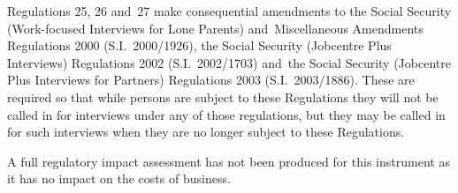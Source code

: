 \documentclass[12pt,a4paper]{article}
\begin{document}
Regulations 25, 26 and~27 make consequential amendments to the Social Security (Work-focused Interviews for Lone Parents) and~Miscellaneous Amendments Regulations 2000 (S.I.~2000/1926), the Social Security (Jobcentre Plus Interviews) Regulations 2002 (S.I.~2002/1703) and~the Social Security (Jobcentre Plus Interviews for Partners) Regulations 2003 (S.I.~2003/1886). These are required so that while persons are subject to these Regulations they will not be called in for interviews under any of those regulations, but they may be called in for such interviews when they are no longer subject to these Regulations.

A full regulatory impact assessment has not been produced for this instrument as it has no impact on the costs of business. 
\end{document}

